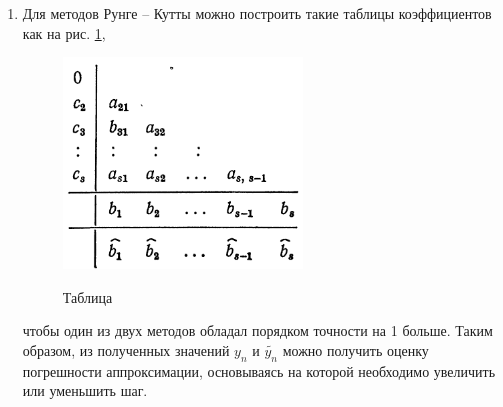 \documentclass[12pt, a4paper]{article}
\begin{document}
\begin{enumerate}
\begin{enumerate}
			\item Для методов Рунге -- Кутты можно построить такие таблицы коэффициентов как на рис. \ref{fig:Special-Butcher}, 
			\begin{figure}[h]
				\centering
				\caption{Таблица }
				\includegraphics[width=0.6\textwidth]{butcher_table_sp}
				\label{fig:Special-Butcher}
			\end{figure}
			 чтобы один из двух методов обладал порядком точности на 1 больше. Таким образом, из полученных значений $y_n$ и $\tilde{y_n}$ можно получить оценку погрешности аппроксимации, основываясь на которой необходимо увеличить или уменьшить шаг.
		\end{enumerate}
		
	\end{enumerate}
\end{document}
